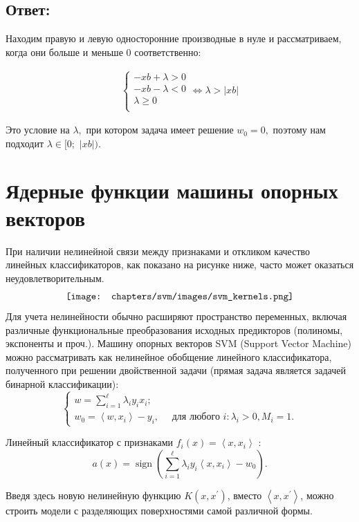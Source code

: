 \subsection{Ответ:}

Находим правую и левую односторонние производные в нуле и рассматриваем, когда они больше и меньше 0 соответственно:

\begin{align*}
    \begin{cases}
        -xb + \lambda > 0\\
        -xb - \lambda < 0\\
        \lambda \geq 0\\
    \end{cases} \Leftrightarrow \lambda > |xb|
\end{align*}

Это условие на $\lambda,$ при котором задача имеет решение $w_0 = 0,$ поэтому нам подходит $\lambda \in [0;$ $|xb|)$.


\section{Ядерные функции машины опорных векторов}
При наличии нелинейной связи между признаками и откликом качество линейных классификаторов, как показано на рисунке ниже,
часто может оказаться неудовлетворительным.
\begin{align*}
    \centering
    \texttt{[image: chapters/svm/images/svm\_kernels.png]}
    \label{fig:image}
\end{align*}
Для учета нелинейности обычно расширяют пространство переменных,
включая различные функциональные преобразования исходных предикторов (полиномы, экспоненты и проч.).
Машину опорных векторов SVM (Support Vector Machine) можно рассматривать как нелинейное обобщение линейного классификатора, полученного при
решении двойственной задачи (прямая задача является задачей бинарной классификации):
$$
\left\{\begin{array}{l}
w=\sum_{i=1}^{\ell} \lambda_i y_i x_i ; \\
w_0=\left\langle w, x_i\right\rangle-y_i, \quad \text { для любого } i: \lambda_i>0, M_i=1 .
\end{array}\right.
$$

Линейный классификатор с признаками $f_i(x)=\left\langle x, x_i\right\rangle$ :
$$
a(x)=\operatorname{sign}\left(\sum_{i=1}^{\ell} \lambda_i y_i\left\langle x, x_i\right\rangle-w_0\right) .
$$

Введя здесь новую нелинейную функцию $K\left(x, x^{\prime}\right)$, вместо $\left\langle x, x^{\prime}\right\rangle$,
можно строить модели с разделяющих поверхностями самой различной формы.

